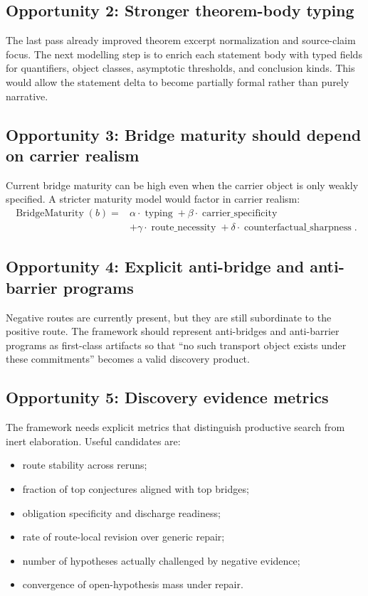 \documentclass[11pt]{article}
\begin{document}
\subsection{Opportunity 2: Stronger theorem-body typing}

The last pass already improved theorem excerpt normalization and source-claim focus. The next modelling step is to enrich each statement body with typed fields for quantifiers, object classes, asymptotic thresholds, and conclusion kinds. This would allow the statement delta to become partially formal rather than purely narrative.

\subsection{Opportunity 3: Bridge maturity should depend on carrier realism}

Current bridge maturity can be high even when the carrier object is only weakly specified. A stricter maturity model would factor in carrier realism:
\[
\begin{aligned}
\operatorname{BridgeMaturity}(b)
= {} & \alpha \cdot \operatorname{typing}
+
\beta \cdot \operatorname{carrier\_specificity} \\
& +
\gamma \cdot \operatorname{route\_necessity}
+
\delta \cdot \operatorname{counterfactual\_sharpness}.
\end{aligned}
\]

\subsection{Opportunity 4: Explicit anti-bridge and anti-barrier programs}

Negative routes are currently present, but they are still subordinate to the positive route. The framework should represent anti-bridges and anti-barrier programs as first-class artifacts so that ``no such transport object exists under these commitments'' becomes a valid discovery product.

\subsection{Opportunity 5: Discovery evidence metrics}

The framework needs explicit metrics that distinguish productive search from inert elaboration. Useful candidates are:

\begin{itemize}[leftmargin=*,itemsep=0.2em]
\item route stability across reruns;
\item fraction of top conjectures aligned with top bridges;
\item obligation specificity and discharge readiness;
\item rate of route-local revision over generic repair;
\item number of hypotheses actually challenged by negative evidence;
\item convergence of open-hypothesis mass under repair.
\end{itemize}
\end{document}
